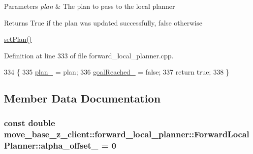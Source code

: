 \begin{DoxyParams}{Parameters}
{\em plan} & The plan to pass to the local planner \\
\hline
\end{DoxyParams}
\begin{DoxyReturn}{Returns}
True if the plan was updated successfully, false otherwise
\end{DoxyReturn}
\hyperlink{classmove__base__z__client_1_1forward__local__planner_1_1ForwardLocalPlanner_a525b842cadd1e69e944907e1945a61c8}{set\+Plan()} 

Definition at line 333 of file forward\+\_\+local\+\_\+planner.\+cpp.


\begin{DoxyCode}
334 \{
335     \hyperlink{classmove__base__z__client_1_1forward__local__planner_1_1ForwardLocalPlanner_a1c6191c999481e31fabd41f7a04041fe}{plan\_} = plan;
336     \hyperlink{classmove__base__z__client_1_1forward__local__planner_1_1ForwardLocalPlanner_a2c86f8381cc3b8677f95f32ae6939023}{goalReached\_} = \textcolor{keyword}{false};
337     \textcolor{keywordflow}{return} \textcolor{keyword}{true};
338 \}
\end{DoxyCode}


\subsection{Member Data Documentation}
\subsubsection[{\texorpdfstring{alpha\+\_\+offset\+\_\+}{alpha_offset_}}]{\setlength{\rightskip}{0pt plus 5cm}const double move\+\_\+base\+\_\+z\+\_\+client\+::forward\+\_\+local\+\_\+planner\+::\+Forward\+Local\+Planner\+::alpha\+\_\+offset\+\_\+ = 0\hspace{0.3cm}{\ttfamily [private]}}\hypertarget{classmove__base__z__client_1_1forward__local__planner_1_1ForwardLocalPlanner_a358adfdd02866b413518dee9d5212b8f}{}\label{classmove__base__z__client_1_1forward__local__planner_1_1ForwardLocalPlanner_a358adfdd02866b413518dee9d5212b8f}


